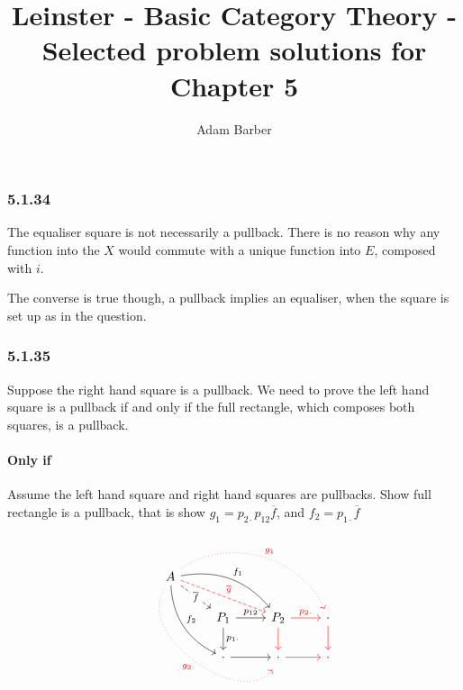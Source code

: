 \documentclass{article}
\begin{document}
\title{Leinster - Basic Category Theory - Selected problem solutions for Chapter 5}
\author{Adam Barber}

\maketitle

\subsubsection*{5.1.34}

The equaliser square is not necessarily a pullback. There is no reason why any function into the $X$ would commute with a unique function into $E$, composed with $i$.

The converse is true though, a pullback implies an equaliser, when the square is set up as in the question.

\subsubsection*{5.1.35}

Suppose the right hand square is a pullback. We need to prove the left hand square is a pullback if and only if the full rectangle, which composes both squares, is a pullback.

\paragraph{Only if}

Assume the left hand square and right hand squares are pullbacks. Show full rectangle is a pullback, that is show $g_1 = p_{2\cdot}p_{12}\overline{f}$, and $f_2 = p_{1\cdot}\overline{f}$

\begin{equation*}
\begin{tikzcd}
A
\arrow[drr, bend left, "f_1"]
\arrow[drr, "\overline{g}", dashed, yshift=0.2ex, red]
\arrow[ddr, bend right, "f_2"]
\arrow[dr, dashed, "\overline{f}" description]
\arrow[drrr, bend left=50, dotted, red, yshift=0.3ex, "g_1"]
\arrow[ddrr, bend right=90, dotted, red, yshift=-0.8ex, "g_2"'] & & \\
& P_1 \arrow[r, "p_{12}"] \arrow[d, "p_{1\cdot}"] & P_2 \arrow[r, "p_{2\cdot}", red] \arrow[d, "", red]
& \cdot \arrow[d, "" , red] \\
& \cdot \arrow[r, ""] & \cdot \arrow[r, "", red]
& \cdot
\end{tikzcd}
\end{equation*}
\end{document}
